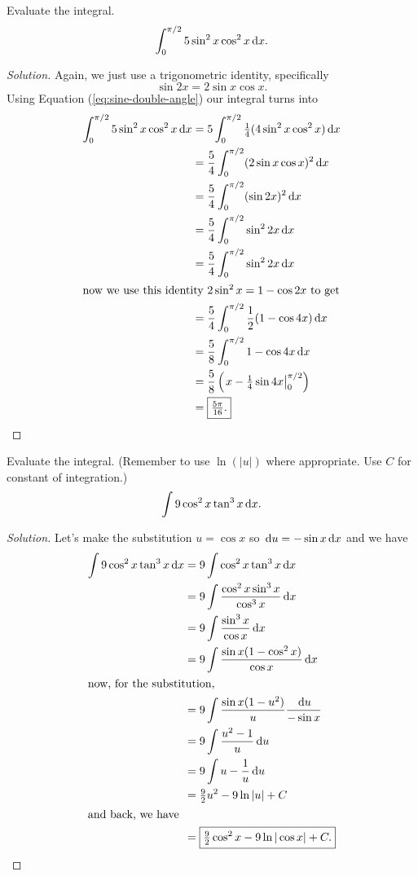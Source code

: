\begin{problem}[WebAssign HW 10, 3]
Evaluate the integral.
\[
\int_0^{\pi/2}5\sin^2 x\cos^2 x\,\mathrm{d} x.
\]
\end{problem}
\begin{proof}[Solution]
Again, we just use a trigonometric identity, specifically
\begin{equation}
  \label{eq:sine-double-angle}
\sin 2 x =2\sin  x \cos x .
\end{equation}
Using Equation (\ref{eq:sine-double-angle}) our integral turns into
\begin{align*}
\int_0^{\pi/2}5\sin^2x\cos^2x\,\mathrm{d} x
&=5\int_0^{\pi/2}\tfrac{1}{4}(4\sin^2 x\cos^2x)\,\mathrm{d} x\\
&=\frac{5}{4}\int_0^{\pi/2}(2\sin x\cos x)^2\,\mathrm{d} x\\
&=\frac{5}{4}\int_0^{\pi/2}(\sin 2x)^2\,\mathrm{d} x\\
&=\frac{5}{4}\int_0^{\pi/2}\sin^2 2x\,\mathrm{d} x\\
&=\frac{5}{4}\int_0^{\pi/2}\sin^2 2x\,\mathrm{d} x\\
\shortintertext{now we use this identity $2\sin^2 x =1-\cos 2 x $
  to get}
&=\frac{5}{4}\int_0^{\pi/2}\frac{1}{2}(1-\cos 4 x )\,\mathrm{d} x \\
&=\frac{5}{8}\int_0^{\pi/2}1-\cos 4 x \,\mathrm{d} x \\
&=\frac{5}{8}\left(\left. x -\tfrac{1}{4}\sin
  4 x \right|_0^{\pi/2}\right)\\
&=\boxed{\tfrac{5\pi}{16}.}
\end{align*}
\end{proof}

\begin{problem}[WebAssign HW 10, 4]
Evaluate the integral. (Remember to use $\ln(|u|)$ where appropriate. Use
$C$ for constant of integration.)
\[
\int 9\cos^2 x\tan^3 x\,\mathrm{d} x.
\]
\end{problem}
\begin{proof}[Solution]
Let's make the substitution $u=\cos x$ so $\,\mathrm{d} u=-\sin x\,\mathrm{d} x$ and we
have
\begingroup
\allowdisplaybreaks
\begin{align*}
\int 9\cos^2 x\tan^3 x\,\mathrm{d} x
&=9\int \cos^2 x\tan^3 x\,\mathrm{d} x\\
&=9\int\frac{\cos^2 x\sin^3 x}{\cos^3 x}\,\mathrm{d} x\\
&=9\int\frac{\sin^3 x}{\cos x}\,\mathrm{d} x\\
&=9\int\frac{\sin x(1-\cos^2 x)}{\cos x}\,\mathrm{d} x\\
\shortintertext{now, for the substitution,}
&=9\int\frac{\sin x(1-u^2)}{u}\frac{\,\mathrm{d} u}{-\sin x}\\
&=9\int\frac{u^2-1}{u}\,\mathrm{d} u\\
&=9\int u-\frac{1}{u}\,\mathrm{d} u\\
&=\tfrac{9}{2}u^2-9\ln|u|+C\\
\shortintertext{and back, we have}
&=\boxed{\tfrac{9}{2}\cos^2 x-9\ln|\cos x|+C.}
\end{align*}
\endgroup
\end{proof}

